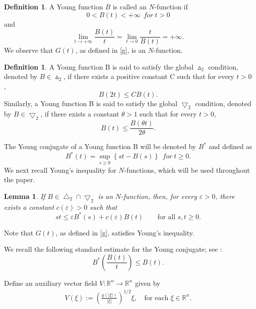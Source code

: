 \documentclass[10pt,a4paper]{article}
\newtheorem{lemma}[theorem]{Lemma}
\theoremstyle{definition}
\newtheorem{definition}[theorem]{Definition}
\numberwithin{equation}{section}
\begin{document}
 \begin{definition}
 	A Young function $B$ is called an $N$-function if
 	$$0<B(t)<+\infty \ \ for \ t>0$$
 	and
 	\begin{equation*}\label{nhanshu}
 		\lim_{t\rightarrow+\infty}\frac{B(t)}{t}=\lim_{t\rightarrow0}\frac{t}{B(t)}=+\infty.
 	\end{equation*}
 We observe that $ G(t)$, as defined in \eqref{g}, is an 
 $N$-function.
 	
 
 \end{definition}
 
 \begin{definition}
 	A Young function B is said to satisfy the global $\vartriangle_2$ condition, denoted by $B\in\vartriangle_2$, if there exists a positive constant C such that for every $t>0$,
 	\begin{equation*}
 		B(2t)\leq CB(t).
 	\end{equation*}
 	Similarly, a Young function B is said to satisfy the global $\bigtriangledown_2$ condition, denoted by $B\in\bigtriangledown_2$, if there exists a  constant $\theta >1$ such that for every $t>0$,
 	\begin{equation*}
 		B(t)\leq \frac{B(\theta t)}{2\theta}.
 	\end{equation*}
 \end{definition}
 	The Young conjugate  of a Young function B will be denoted by $B^{\ast}$ and defined as
 $$B^{\ast}(t)=\sup_{s\geq 0}\left\lbrace st-B(s)\right\rbrace  \ \ for \ t\geq 0.$$
 We next recall Young's inequality for $N$-functions, which will be used throughout the paper.
 \begin{lemma}\cite{yz1}\label{gyoung}
 If $B\in \bigtriangleup_{2}\cap \bigtriangledown_{2}$ is an
 	$N$-function, then, for every $\varepsilon>0$, there exists a constant
 	$c(\varepsilon)>0$ such that
 	\[
 	st\leq \varepsilon B^{*}(s)+c(\varepsilon)B(t)
 	\qquad \text{for all } s,t\geq0.
 	\]
 \end{lemma}
 Note that $G(t)$, as defined in \eqref{g}, satisfies   Young's inequality.
 
We   recall the following standard estimate for the Young conjugate; see \cite{a1}:
 \begin{equation}\label{a(x)4}
 	B^{*}\left( \frac{B(t)}{t}\right) \leqslant B(t).
 \end{equation}
  

Define an auxiliary vector field $V : \mathbb{R}^n \to \mathbb{R}^n$ given by
\begin{align*}
	V(\xi) := \left( \frac{g(|\xi|)}{|\xi|} \right)^{1/2} \xi, \quad \text{for each } \xi \in \mathbb{R}^n.
\end{align*}
\end{document}
